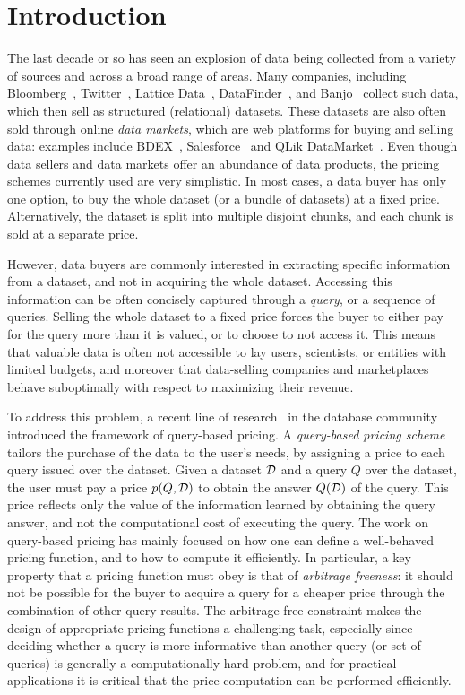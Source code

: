 \section{Introduction}
\label{sec:intro}

The last decade or so has seen an explosion of data being collected from a variety of sources and across a broad range of areas. Many companies, including Bloomberg~\cite{bloomberg}, Twitter~\cite{twitterapi}, Lattice Data~\cite{lattice}, DataFinder~\cite{datafinder}, and Banjo~\cite{banjo} collect such data, which then sell as structured (relational) datasets. 
These datasets are also often sold through online {\em data markets}, which are web platforms for buying and selling data: examples include BDEX~\cite{bdex}, Salesforce~\cite{salesforce} and QLik DataMarket~\cite{qlik}. Even though data sellers and data markets offer an abundance of data products, the pricing schemes currently used are very simplistic. In most cases, a data buyer has only one option, to buy the whole dataset (or a bundle of datasets) at a fixed price. Alternatively, the dataset is split into multiple disjoint chunks, and each chunk is sold at a separate price. 

However, data buyers are commonly interested in extracting specific information from a dataset, and not in acquiring the whole dataset. Accessing this information can be often concisely captured through a {\em query}, or a sequence of queries. Selling the whole dataset to a fixed price forces the buyer to either pay for the query more than it is valued, or to choose to not access it. This means that valuable data is often not accessible to lay users, scientists, or entities with limited budgets, and moreover that data-selling companies and marketplaces behave suboptimally with respect to maximizing their revenue.

To address this problem, a recent line of research~\cite{KUBHS12,KUBHS13,deep2017qirana} in the database community introduced the framework of  query-based pricing. A {\em query-based pricing scheme} tailors the purchase of the data to the user's needs, by assigning a price to each query issued over the dataset. Given a dataset $\mathcal{D}$ and a query $Q$ over the dataset, the user must pay a price $p(Q,\mathcal{D})$ to obtain the answer $Q(\mathcal{D})$ of the query. This price reflects only the value of the information learned by obtaining the query answer, and not the computational cost of executing the query. The work on query-based pricing has mainly focused on how one can define a well-behaved pricing function, and to how to compute it efficiently. In particular, a key property that a pricing function must obey is that of {\em arbitrage freeness}: it should not be possible for the buyer to acquire a query for a cheaper price through the combination of other query results. The arbitrage-free constraint makes the design of appropriate pricing functions a challenging task, especially since deciding whether a query is more informative than another query (or set of queries) is generally a computationally hard problem, and for practical applications it is critical that the price computation can be performed efficiently.

